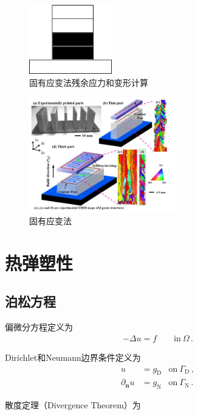 \begin{figure}[!htbp]
  \centering
  \includegraphics[height=3cm]{fig/4/4.png}
  \caption{固有应变法残余应力和变形计算}
  \label{fig:4.1.1:4}
\end{figure}

\begin{figure}[!htbp]
  \centering
  \includegraphics[height=5cm]{fig/4/6.png}
  \caption{固有应变法}
  \label{fig:4.1.1:5}
\end{figure}

\section{热弹塑性}

\subsection{泊松方程}

偏微分方程定义为
\begin{align}\label{eq:4.1.1:1}
  -\Delta u = f \qquad \mathrm{in}\ \Omega\,.
\end{align}

Dirichlet和Neumann边界条件定义为
\begin{subequations}
  \begin{align}\label{eq:4.1.1:2}
    u &= g_{\mathrm D} &\mathrm{on}\ \Gamma_{\mathrm D}\,, \\
    \partial_{\mathbf n}u & = g_{\mathrm N} &\mathrm{on}\ \Gamma_{\mathrm N}\,.
  \end{align}
\end{subequations}

散度定理（Divergence Theorem）为

